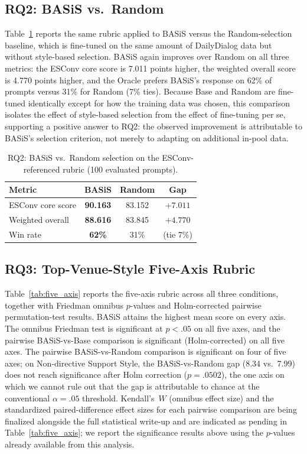 \documentclass[manuscript,review,anonymous]{acmart}
\begin{document}
\subsection{RQ2: BASiS vs.\ Random}
Table~\ref{tab:basis_vs_random} reports the same rubric applied to BASiS versus the Random-selection baseline, which is fine-tuned on the same amount of DailyDialog data but without style-based selection. BASiS again improves over Random on all three metrics: the ESConv core score is 7.011 points higher, the weighted overall score is 4.770 points higher, and the Oracle prefers BASiS's response on 62\% of prompts versus 31\% for Random (7\% ties). Because Base and Random are fine-tuned identically except for how the training data was chosen, this comparison isolates the effect of style-based selection from the effect of fine-tuning per se, supporting a positive answer to RQ2: the observed improvement is attributable to BASiS's selection criterion, not merely to adapting on additional in-pool data.

\begin{table}[t]
  \caption{RQ2: BASiS vs.\ Random selection on the ESConv-referenced rubric (100 evaluated prompts).}
  \label{tab:basis_vs_random}
  \begin{tabular}{lccc}
    \toprule
    Metric & BASiS & Random & Gap \\
    \midrule
    ESConv core score  & \textbf{90.163} & 83.152 & $+7.011$ \\
    Weighted overall    & \textbf{88.616} & 83.845 & $+4.770$ \\
    Win rate             & \textbf{62\%}   & 31\%   & (tie 7\%) \\
    \bottomrule
  \end{tabular}
\end{table}

\subsection{RQ3: Top-Venue-Style Five-Axis Rubric}
Table~\ref{tab:five_axis} reports the five-axis rubric across all three conditions, together with Friedman omnibus $p$-values and Holm-corrected pairwise permutation-test results. BASiS attains the highest mean score on every axis. The omnibus Friedman test is significant at $p<.05$ on all five axes, and the pairwise BASiS-vs-Base comparison is significant (Holm-corrected) on all five axes. The pairwise BASiS-vs-Random comparison is significant on four of five axes; on Non-directive Support Style, the BASiS-vs-Random gap (8.34 vs.\ 7.99) does not reach significance after Holm correction ($p=.0502$), the one axis on which we cannot rule out that the gap is attributable to chance at the conventional $\alpha=.05$ threshold. Kendall's~$W$ (omnibus effect size) and the standardized paired-difference effect sizes for each pairwise comparison are being finalized alongside the full statistical write-up and are indicated as pending in Table~\ref{tab:five_axis}; we report the significance results above using the $p$-values already available from this analysis.
\end{document}
